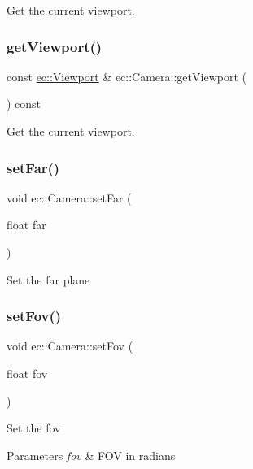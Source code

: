 Get the current viewport. \mbox{\label{classec_1_1_camera_adb2920a7a634aadcaca579eaf3fc1ad0}} 
\subsubsection{\texorpdfstring{get\+Viewport()}{getViewport()}\hspace{0.1cm}{\footnotesize\ttfamily [2/2]}}
{\footnotesize\ttfamily const \mbox{\hyperlink{classec_1_1_viewport}{ec\+::\+Viewport}} \& ec\+::\+Camera\+::get\+Viewport (\begin{DoxyParamCaption}{ }\end{DoxyParamCaption}) const}

Get the current viewport. \mbox{\label{classec_1_1_camera_abdc800333490ec4f890559951340bd08}} 
\subsubsection{\texorpdfstring{set\+Far()}{setFar()}}
{\footnotesize\ttfamily void ec\+::\+Camera\+::set\+Far (\begin{DoxyParamCaption}\item[{float}]{far }\end{DoxyParamCaption})}

Set the far plane \mbox{\label{classec_1_1_camera_a1003feebe7df69a508f684c1c67f1388}} 
\subsubsection{\texorpdfstring{set\+Fov()}{setFov()}}
{\footnotesize\ttfamily void ec\+::\+Camera\+::set\+Fov (\begin{DoxyParamCaption}\item[{float}]{fov }\end{DoxyParamCaption})}

Set the fov 
\begin{DoxyParams}{Parameters}
{\em fov} & F\+OV in radians \\
\hline
\end{DoxyParams}
\mbox{\label{classec_1_1_camera_af0c1f82f4cb2aeb3908b858093080556}} 
